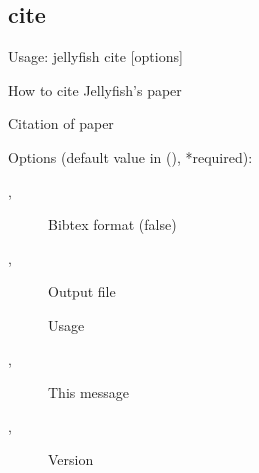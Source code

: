 \subsection{cite}
\noindent Usage: jellyfish cite [options]

\noindent How to cite Jellyfish's paper

\noindent Citation of paper

\noindent Options (default value in (), *required):
\begin{description}
\item[,] \noindent Bibtex format (false)
\item[,] \noindent Output file
\item[] \noindent Usage
\item[,] \noindent This message
\item[,] \noindent Version
\end{description}
